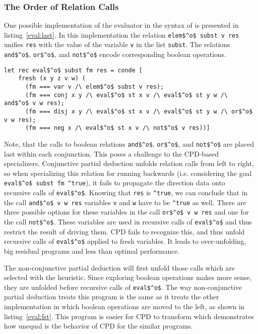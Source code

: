 \subsubsection{The Order of Relation Calls}

One possible implementation of the evaluator in the syntax of \oc{} is presented in listing~\ref{eval:last}.
In this implementation the relation \lstinline{elem$^o$ subst v res} unifies \lstinline{res} with the value of the variable \lstinline{v} in the list \lstinline{subst}.
The relations \lstinline{and$^o$}, \lstinline{or$^o$}, and \lstinline{not$^o$} encode corresponding boolean operations.

\begin{lstlisting}[label={eval:last}, caption={Evaluator of formulas with boolean operation last}, captionpos=b]
  let rec eval$^o$ subst fm res = conde [
    fresh (x y z v w) (
      (fm === var v /\ elem$^o$ subst v res);
      (fm === conj x y /\ eval$^o$ st x v /\ eval$^o$ st y w /\ and$^o$ v w res);
      (fm === disj x y /\ eval$^o$ st x v /\ eval$^o$ st y w /\ or$^o$ v w res);
      (fm === neg x /\ eval$^o$ st x v /\ not$^o$ v res))]
\end{lstlisting}

Note, that the calls to boolean relations \lstinline{and$^o$}, \lstinline{or$^o$}, and \lstinline{not$^o$} are placed last within each conjunction.
This poses a challenge to the CPD-based specializers.
Conjunctive partial deduction unfolds relation calls from left to right, so when specializing this relation for running backwards (i.e. considering the goal \lstinline{eval$^o$ subst fm ^true}), it fails to propagate the direction data onto recursive calls of \lstinline{eval$^o$}.
Knowing that \lstinline{res} is \lstinline{^true}, we can conclude that in the call \lstinline{and$^o$ v w res} variables \lstinline{v} and \lstinline{w} have to be \lstinline{^true} as well.
There are three possible options for these variables in the call \lstinline{or$^o$ v w res} and one for the call \lstinline{not$^o$}.
These variables are used in recursive calls of \lstinline{eval$^o$} and thus restrict the result of driving them.
CPD fails to recognize this, and thus unfold recursive calls of \lstinline{eval$^o$} applied to fresh variables.
It leads to over-unfolding, big residual programs and less than optimal performance.

The non-conjunctive partial deduction will first unfold those calls which are selected with the heuristic.
Since exploring boolean operations makes more sense, they are unfolded before recursive calls of \lstinline{eval$^o$}.
The way non-conjunctive partial deduction treats this program is the same as it treats the other implementation in which boolean operations are moved to the left, as shown in listing~\ref{eval:fst}.
This program is easier for CPD to transform which demonstrates how unequal is the behavior of CPD for the similar programs.

